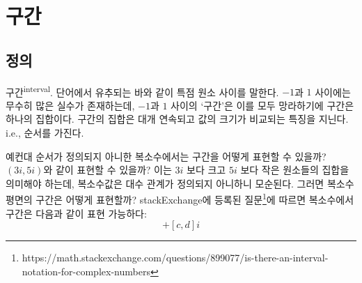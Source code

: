 \documentclass[../note.tex]{subfiles}
\begin{document}
\section{구간}
\subsection{정의}
\begin{definition}[구간]

  구간\textsuperscript{interval}. 단어에서 유추되는 바와 같이 특점 원소 사이를 말한다. $-1$과 $1$ 사이에는 무수히 많은 실수가 존재하는데, $-1$과 $1$ 사이의 `구간'은 이를 모두 망라하기에 구간은 하나의 집합이다. 구간의 집합은 대개 연속되고 값의 크기가 비교되는 특징을 지닌다. i.e., 순서를 가진다.
\end{definition}
\begin{note}
  예컨대 순서가 정의되지 아니한 복소수에서는 구간을 어떻게 표현할 수 있을까? $(3i, 5i)$와 같이 표현할 수 있을까? 이는 $3i$ 보다 크고 $5i$ 보다 작은 원소들의 집합을 의미해야 하는데, 복소수값은 대수 관계가 정의되지 아니하니 모순된다. 그러면 복소수 평면의 구간은 어떻게 표현할까? stackExchange에 등록된 질문\footnote{https://math.stackexchange.com/questions/899077/is-there-an-interval-notation-for-complex-numbers}에 따르면 복소수에서 구간은 다음과 같이 표현 가능하다:
  \begin{equation}
    [a, b] + [c, d]i
  \end{equation}
\end{note}
\end{document}

